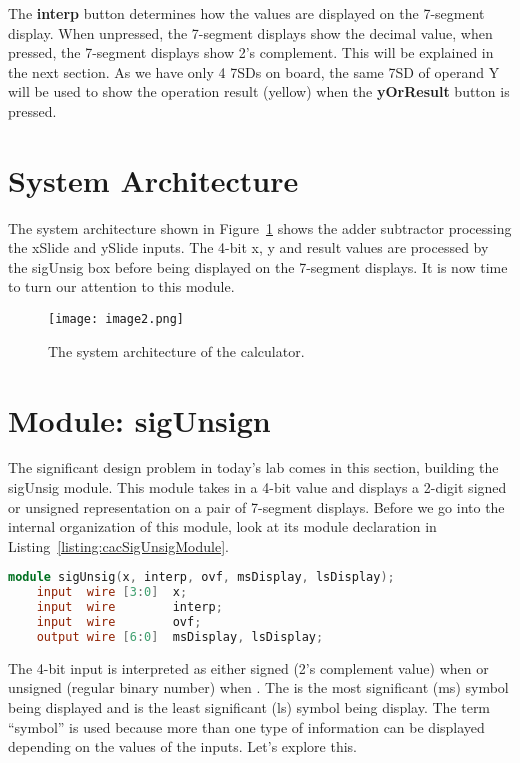The \textbf{interp} button determines how the values are displayed on the
7-segment display. When unpressed, the 7-segment displays show the
decimal value, when pressed, the 7-segment displays show 2's complement.
This will be explained in the next section. As we have only 4 7SDs on
board, the same 7SD of operand Y will be used to show the operation
result (yellow) when the \textbf{yOrResult} button is pressed.

\section{System Architecture}

The system architecture shown in Figure~\ref{fig:sysArchCalc} shows the adder subtractor
processing the xSlide and ySlide inputs. The 4-bit x, y and result
values are processed by the sigUnsig box before being displayed on the
7-segment displays. It is now time to turn our attention to this module.

\begin{figure}[ht]
\texttt{[image:  image2.png]}
\caption{The system architecture of the calculator.}
\label{fig:sysArchCalc}
\end{figure}


\section{Module: sigUnsign}

The significant design problem in today's lab comes in this section,
building the sigUnsig module. This module takes in a 4-bit value and
displays a 2-digit signed or unsigned representation on a pair of
7-segment displays. Before we go into the internal organization of this
module, look at its module declaration in Listing~\ref{listing:cacSigUnsigModule}.


\begin{lstlisting}[language=Verilog,
 caption={Module declaration for the sigUnsig module.},
 label={listing:cacSigUnsigModule},
 frame=single]
 module sigUnsig(x, interp, ovf, msDisplay, lsDisplay);    
    input  wire [3:0]  x;	 	 
    input  wire        interp;
    input  wire        ovf;
    output wire [6:0]  msDisplay, lsDisplay;
 \end{lstlisting}

The 4-bit input  is interpreted as either signed (2's complement
value) when  or unsigned (regular binary number) when
.  The  is the most significant (ms)
symbol being displayed and  is the least significant (ls)
symbol being display.  The term ``symbol'' is used because more than
one type of information can be displayed depending on the values
of the inputs.  Let's explore this.

